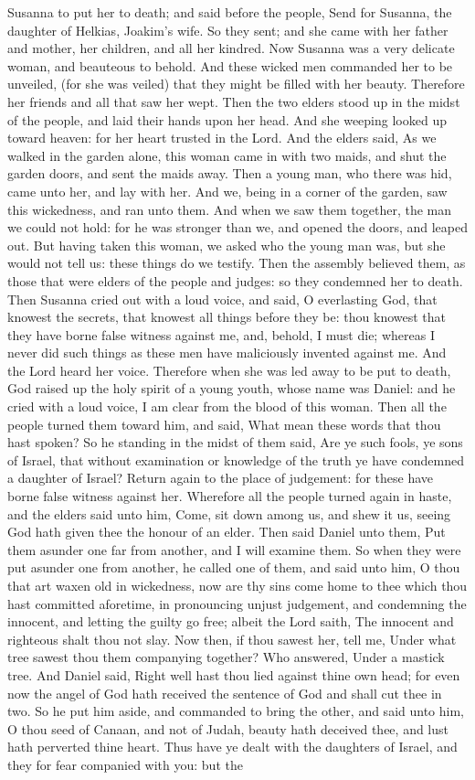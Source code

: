 Susanna to put her to death; and said before the people, Send for Susanna, the daughter of Helkias, Joakim’s wife. So they sent; and she came with her father and mother, her children, and all her kindred. Now Susanna was a very delicate woman, and beauteous to behold. And these wicked men commanded her to be unveiled, (for she was veiled) that they might be filled with her beauty. Therefore her friends and all that saw her wept. Then the two elders stood up in the midst of the people, and laid their hands upon her head. And she weeping looked up toward heaven: for her heart trusted in the Lord. And the elders said, As we walked in the garden alone, this woman came in with two maids, and shut the garden doors, and sent the maids away. Then a young man, who there was hid, came unto her, and lay with her. And we, being in a corner of the garden, saw this wickedness, and ran unto them. And when we saw them together, the man we could not hold: for he was stronger than we, and opened the doors, and leaped out. But having taken this woman, we asked who the young man was, but she would not tell us: these things do we testify. Then the assembly believed them, as those that were elders of the people and judges: so they condemned her to death. Then Susanna cried out with a loud voice, and said, O everlasting God, that knowest the secrets, that knowest all things before they be: thou knowest that they have borne false witness against me, and, behold, I must die; whereas I never did such things as these men have maliciously invented against me. And the Lord heard her voice. Therefore when she was led away to be put to death, God raised up the holy spirit of a young youth, whose name was Daniel: and he cried with a loud voice, I am clear from the blood of this woman. Then all the people turned them toward him, and said, What mean these words that thou hast spoken? So he standing in the midst of them said, Are ye such fools, ye sons of Israel, that without examination or knowledge of the truth ye have condemned a daughter of Israel? Return again to the place of judgement: for these have borne false witness against her. Wherefore all the people turned again in haste, and the elders said unto him, Come, sit down among us, and shew it us, seeing God hath given thee the honour of an elder. Then said Daniel unto them, Put them asunder one far from another, and I will examine them. So when they were put asunder one from another, he called one of them, and said unto him, O thou that art waxen old in wickedness, now are thy sins come home to thee which thou hast committed aforetime, in pronouncing unjust judgement, and condemning the innocent, and letting the guilty go free; albeit the Lord saith, The innocent and righteous shalt thou not slay. Now then, if thou sawest her, tell me, Under what tree sawest thou them companying together? Who answered, Under a mastick tree. And Daniel said, Right well hast thou lied against thine own head; for even now the angel of God hath received the sentence of God and shall cut thee in two. So he put him aside, and commanded to bring the other, and said unto him, O thou seed of Canaan, and not of Judah, beauty hath deceived thee, and lust hath perverted thine heart. Thus have ye dealt with the daughters of Israel, and they for fear companied with you: but the 